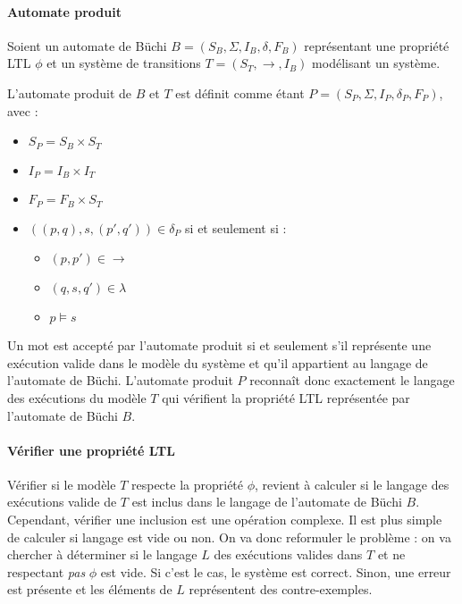 \paragraph{Automate produit}

Soient un automate de Büchi \(B = (S_B, \Sigma, I_B, \delta, F_B)\) représentant
une propriété \ac{LTL} \(\phi\) et un système de transitions \(T = (S_T, \rightarrow,
I_B)\) modélisant un système.

L'automate produit de \(B\) et \(T\) est définit comme étant \(P = (S_P, \Sigma,
I_P, \delta_P, F_P)\), avec :

\begin{itemize}
\item
  \(S_P = S_B \times S_T\)
\item
  \(I_P = I_B \times I_T\)
\item
  \(F_P = F_B \times S_T\)
\item
  \(((p, q), s, (p', q')) \in \delta_P\) si et seulement si :

  \begin{itemize}
  \item
    \((p, p') \in \rightarrow\)
  \item
    \((q, s, q') \in \lambda\)
  \item
    \(p \models s\)
  \end{itemize}
\end{itemize}

Un mot est accepté par l'automate produit si et seulement s’il représente
une exécution valide dans le modèle du système et qu'il appartient au langage
de l'automate de Büchi.
L'automate produit \(P\) reconnaît donc exactement le langage des exécutions du
modèle \(T\) qui vérifient la propriété \ac{LTL} représentée par l'automate de
Büchi \(B\).

\paragraph{Vérifier une propriété LTL}

Vérifier si le modèle \(T\) respecte la propriété \(\phi\), revient à calculer
si le langage des exécutions valide de \(T\) est inclus dans le langage de
l'automate de Büchi \(B\). Cependant, vérifier une inclusion est une opération
complexe. Il est plus simple de calculer si langage est vide ou non. On va donc
reformuler le problème : on va chercher à déterminer si le langage \(L\) des
exécutions valides dans \(T\) et ne respectant \emph{pas} \(\phi\) est vide.
Si c'est le cas, le système est correct. Sinon, une erreur est présente et les
éléments de \(L\) représentent des contre-exemples.

